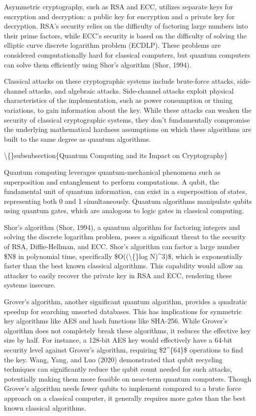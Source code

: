 \documentclass{article}
\begin{document}
Asymmetric cryptography, such as RSA and ECC, utilizes separate keys for encryption and decryption: a public key for encryption and a private key for decryption. RSA's security relies on the difficulty of factoring large numbers into their prime factors, while ECC's security is based on the difficulty of solving the elliptic curve discrete logarithm problem (ECDLP). These problems are considered computationally hard for classical computers, but quantum computers can solve them efficiently using Shor's algorithm (Shor, 1994).

Classical attacks on these cryptographic systems include brute-force attacks, side-channel attacks, and algebraic attacks. Side-channel attacks exploit physical characteristics of the implementation, such as power consumption or timing variations, to gain information about the key. While these attacks can weaken the security of classical cryptographic systems, they don't fundamentally compromise the underlying mathematical hardness assumptions on which these algorithms are built to the same degree as quantum algorithms.

\textbackslash\{\}subsubsection\{Quantum Computing and its Impact on Cryptography\}

Quantum computing leverages quantum-mechanical phenomena such as superposition and entanglement to perform computations. A qubit, the fundamental unit of quantum information, can exist in a superposition of states, representing both 0 and 1 simultaneously. Quantum algorithms manipulate qubits using quantum gates, which are analogous to logic gates in classical computing.

Shor's algorithm (Shor, 1994), a quantum algorithm for factoring integers and solving the discrete logarithm problem, poses a significant threat to the security of RSA, Diffie-Hellman, and ECC. Shor's algorithm can factor a large number \$N\$ in polynomial time, specifically \$O((\textbackslash\{\}log N)\textasciicircum{}3)\$, which is exponentially faster than the best known classical algorithms. This capability would allow an attacker to easily recover the private key in RSA and ECC, rendering these systems insecure.

Grover's algorithm, another significant quantum algorithm, provides a quadratic speedup for searching unsorted databases. This has implications for symmetric key algorithms like AES and hash functions like SHA-256. While Grover's algorithm does not completely break these algorithms, it reduces the effective key size by half. For instance, a 128-bit AES key would effectively have a 64-bit security level against Grover's algorithm, requiring \$2\textasciicircum{}\{64\}\$ operations to find the key. Wang, Yang, and Luo (2020) demonstrated that qubit recycling techniques can significantly reduce the qubit count needed for such attacks, potentially making them more feasible on near-term quantum computers. Though Grover's algorithm needs fewer qubits to implement compared to a brute force approach on a classical computer, it generally requires more gates than the best known classical algorithms.
\end{document}
